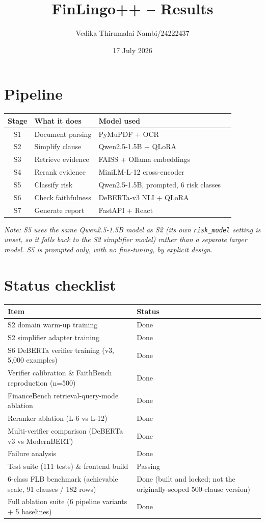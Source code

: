 \documentclass[11pt]{article}
\title{FinLingo++ -- Results}
\author{Vedika Thirumalai Nambi/24222437}
\date{17 July 2026}
\begin{document}
\maketitle

\section{Pipeline}
\begin{table}[h!]
\centering
\begin{tabular}{clll}
\toprule
Stage & What it does & Model used \\
\midrule
S1 & Document parsing & PyMuPDF + OCR \\
S2 & Simplify clause & Qwen2.5-1.5B + QLoRA \\
S3 & Retrieve evidence & FAISS + Ollama embeddings \\
S4 & Rerank evidence & MiniLM-L-12 cross-encoder \\
S5 & Classify risk & Qwen2.5-1.5B, prompted, 6 risk classes \\
S6 & Check faithfulness & DeBERTa-v3 NLI + QLoRA \\
S7 & Generate report & FastAPI + React \\
\bottomrule
\end{tabular}
\end{table}
\noindent\textit{Note: S5 uses the same Qwen2.5-1.5B model as S2 (its own \texttt{risk\_model}
setting is unset, so it falls back to the S2 simplifier model) rather than a separate larger
model. S5 is prompted only, with no fine-tuning, by explicit design.}

\section{Status checklist}
\begin{table}[h!]
\centering
\begin{tabular}{ll}
\toprule
Item & Status \\
\midrule
S2 domain warm-up training & Done \\
S2 simplifier adapter training & Done \\
S6 DeBERTa verifier training (v3, 5,000 examples) & Done \\
Verifier calibration \& FaithBench reproduction (n=500) & Done \\
FinanceBench retrieval-query-mode ablation & Done \\
Reranker ablation (L-6 vs L-12) & Done \\
Multi-verifier comparison (DeBERTa v3 vs ModernBERT) & Done \\
Failure analysis & Done \\
Test suite (111 tests) \& frontend build & Passing \\
6-class FLB benchmark (achievable scale, 91 clauses / 182 rows) & Done (built and locked; not the originally-scoped 500-clause version) \\
Full ablation suite (6 pipeline variants + 5 baselines) & Done \\
\bottomrule
\end{tabular}
\end{table}
\end{document}
